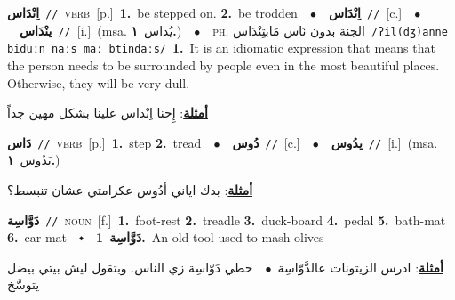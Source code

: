\documentclass[10pt,a4paper,twoside]{article} %
\begin{document}
\begin{multicols}{2}
{\setlength\topsep{0pt}\textbf{\foreignlanguage{arabic}{اِنْدَاس}}\ {\color{gray}\texttt{//}\color{black}}\ \textsc{verb}\ [p.]\ \textbf{1.}~be stepped on.  \textbf{2.}~be trodden\ \ $\bullet$\ \ \setlength\topsep{0pt}\textbf{\foreignlanguage{arabic}{اِنْدَاس}}\ {\color{gray}\texttt{//}\color{black}}\ [c.]\ \ $\bullet$\ \ \setlength\topsep{0pt}\textbf{\foreignlanguage{arabic}{ينْدَاس}}\ {\color{gray}\texttt{//}\color{black}}\ [i.]\ \color{gray}(msa. \foreignlanguage{arabic}{يُداس}~\foreignlanguage{arabic}{\textbf{١.}})\color{black}\ \ $\bullet$\ \ \textsc{ph.} \color{gray} \foreignlanguage{arabic}{الجنة بدون نَاس مَابتِنْدَاس}\color{black}\ {\color{gray}\texttt{/{\sffamily ʔil(dʒ)anne biduːn naːs maː btindaːs}/}\color{black}}\ \textbf{1.}~It is an idiomatic expression that means that the person needs to be surrounded by people even in the most beautiful places. Otherwise, they will be very dull.\  \begin{flushright}\color{gray}\foreignlanguage{arabic}{\textbf{\underline{\foreignlanguage{arabic}{أمثلة}}}: إِحنا اِنْداس علينا بشكل مهين جداً}\end{flushright}\color{black}} \vspace{2mm}

{\setlength\topsep{0pt}\textbf{\foreignlanguage{arabic}{دَاس}}\ {\color{gray}\texttt{//}\color{black}}\ \textsc{verb}\ [p.]\ \textbf{1.}~step  \textbf{2.}~tread\ \ $\bullet$\ \ \setlength\topsep{0pt}\textbf{\foreignlanguage{arabic}{دُوس}}\ {\color{gray}\texttt{//}\color{black}}\ [c.]\ \ $\bullet$\ \ \setlength\topsep{0pt}\textbf{\foreignlanguage{arabic}{يدُوس}}\ {\color{gray}\texttt{//}\color{black}}\ [i.]\ \color{gray}(msa. \foreignlanguage{arabic}{يَدُوس}~\foreignlanguage{arabic}{\textbf{١.}})\color{black}\  \begin{flushright}\color{gray}\foreignlanguage{arabic}{\textbf{\underline{\foreignlanguage{arabic}{أمثلة}}}: بدك اياني أدُوس عكرامتي عشان تنبسط؟}\end{flushright}\color{black}} \vspace{2mm}

{\setlength\topsep{0pt}\textbf{\foreignlanguage{arabic}{دَوَّاسِة}}\ {\color{gray}\texttt{//}\color{black}}\ \textsc{noun}\ [f.]\ \textbf{1.}~foot-rest  \textbf{2.}~treadle  \textbf{3.}~duck-board  \textbf{4.}~pedal  \textbf{5.}~bath-mat  \textbf{6.}~car-mat\ \ $\smblkdiamond$\ \ \setlength\topsep{0pt}\textbf{\foreignlanguage{arabic}{دَوَّاسِة}}\ \textbf{1.}~An old tool used to mash olives\  \begin{flushright}\color{gray}\foreignlanguage{arabic}{\textbf{\underline{\foreignlanguage{arabic}{أمثلة}}}: ادرس الزيتونات عالدَّوّاسِة\ $\bullet$\ \  حطي دَوّاسِة زي الناس. وبتقول ليش بيتي بيضل يتوسَّخ}\end{flushright}\color{black}} \vspace{2mm}


\end{multicols}
\end{document}
